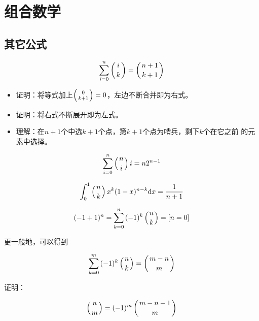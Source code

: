 \chapter{组合数学}
\minitoc




\section{其它公式}
\begin{theorem}
    \begin{displaymath}
        \sum_{i=0}^n\left(i \atop k\right)=\left(n+1 \atop k+1\right)
    \end{displaymath}
\end{theorem}
\begin{itemize}
    \item 证明：将等式加上$\left(0 \atop k+1\right)=0$，左边不断合并即为右式。
    \item 证明：将右式不断展开即为左式。
    \item 理解：在$n+1$个中选$k+1$个点，第$k+1$个点为哨兵，剩下$k$个在它之前
    的元素中选择。
\end{itemize}
\begin{theorem}
    \begin{displaymath}
        \sum_{i=0}^n{\left(n \atop i\right)i}=n2^{n-1}
    \end{displaymath}
\end{theorem}
\begin{theorem}
    \begin{displaymath}
        \int_0^1{\left(n \atop k\right)x^k(1-x)^{n-k}\mathrm{d} x}=\frac{1}{n+1}
    \end{displaymath}
\end{theorem}
\begin{theorem}
    \begin{displaymath}
        (-1+1)^n=\sum_{k=0}^n{(-1)^k\left(n \atop k\right)}=[n=0]
    \end{displaymath}
\end{theorem}
更一般地，可以得到
\begin{theorem}
    \begin{displaymath}\label{BSum}
        \sum_{k=0}^m{(-1)^k\left(n \atop k\right)}=\left(m-n \atop m\right)
    \end{displaymath}
\end{theorem}
证明：
\begin{lemma}[上指标反转]\label{BSL}
    \begin{displaymath}
        \left(n \atop m\right)=(-1)^m\left(m-n-1 \atop m\right)
    \end{displaymath}
\end{lemma}
